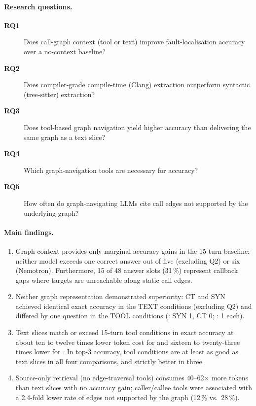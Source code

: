 \paragraph{Research questions.}
\begin{description}
  \item[\textbf{RQ1}] Does call-graph context (tool or text) improve
    fault-localisation accuracy over a no-context baseline?
  \item[\textbf{RQ2}] Does compiler-grade compile-time (Clang) extraction
    outperform syntactic (tree-sitter) extraction?
  \item[\textbf{RQ3}] Does tool-based graph navigation yield higher accuracy
    than delivering the same graph as a text slice?
  \item[\textbf{RQ4}] Which graph-navigation tools are necessary for accuracy?
  \item[\textbf{RQ5}] How often do graph-navigating LLMs cite call edges not
    supported by the underlying graph?
\end{description}

\paragraph{Main findings.}
\begin{enumerate}
  \item Graph context provides only marginal accuracy gains in the 15-turn baseline: neither model
    exceeds one correct answer out of five (excluding Q2) or six (Nemotron).
    Furthermore, 15 of 48 answer slots (31\,\%) represent callback gaps where
    targets are unreachable along static call edges.
  \item Neither graph representation demonstrated superiority: \textsc{CT} and \textsc{SYN}
    achieved identical exact accuracy in the \textsc{TEXT} conditions (excluding Q2) and differed by one question
    in the \textsc{TOOL} conditions (\qwen: SYN 1, CT 0; \nemotron: 1 each).
  \item Text slices match or exceed 15-turn tool conditions in exact accuracy at
    about ten to twelve times lower token cost for \qwen and sixteen to twenty-three
    times lower for \nemotron. In top-3 accuracy, tool conditions are at least as good as
    text slices in all four comparisons, and strictly better in three.
  \item Source-only retrieval (no edge-traversal tools) consumes 40--62$\times$ more tokens
    than text slices with no accuracy gain; caller/callee tools were associated with
    a 2.4-fold lower rate of edges not supported by the graph (12\,\% vs.\ 28\,\%).
\end{enumerate}

